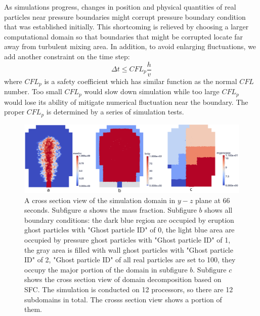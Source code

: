 As simulations progress, changes in position and physical quantities of real particles near pressure boundaries might corrupt pressure boundary condition that was established initially. This shortcoming is relieved by choosing a larger computational domain so that boundaries that might be corrupted locate far away from turbulent mixing area. In addition, to avoid enlarging fluctuations, we add another constraint on the time step: 
\begin{equation}
\Delta t \leq CFL_p \dfrac{h}{v}
\end{equation}
where $CFL_p$ is a safety coefficient which has similar function as the normal $CFL$ number. Too small $CFL_p$ would slow down simulation while too large $CFL_p$ would lose its ability of mitigate numerical fluctuation near the boundary. The proper $CFL_p$ is determined by a series of simulation tests.

\begin{figure}
\center
\includegraphics[width=18cm]{Chapter-3/Figures/t120_bc_proc}
\caption{A cross section view of the simulation domain in $y-z$ plane at 66 seconds. Subfigure $a$ shows the mass fraction. Subfigure $b$ shows all boundary conditions: the dark blue region are occupied by eruption ghost particles with "Ghost particle ID" of 0, the light blue area are occupied by pressure ghost particles with "Ghost particle ID" of 1, the gray area is filled with wall ghost particles with "Ghost particle ID" of 2, "Ghost particle ID" of all real particles are set to 100, they occupy the major portion of the domain in subfigure $b$. Subfigure $c$ shows the cross section view of domain decomposition based on SFC. The simulation is conducted on 12 processors, so there are 12 subdomains in total. The crosss section view shows a portion of them.}
\label{fig:bc_and_domain_decomp}
\end{figure}